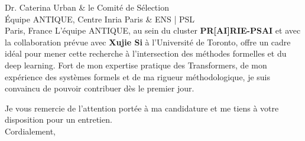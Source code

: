 \documentclass[11pt,a4paper]{letter}
\begin{document}
\begin{letter}{Dr. Caterina Urban \& le Comité de Sélection \\ Équipe ANTIQUE, Centre Inria Paris \& ENS | PSL \\ Paris, France}
L'équipe ANTIQUE, au sein du cluster \textbf{PR[AI]RIE-PSAI} et avec la collaboration prévue avec \textbf{Xujie Si} à l'Université de Toronto, offre un cadre idéal pour mener cette recherche à l'intersection des méthodes formelles et du deep learning. Fort de mon expertise pratique des Transformers, de mon expérience des systèmes formels et de ma rigueur méthodologique, je suis convaincu de pouvoir contribuer dès le premier jour.

\closing{Je vous remercie de l'attention portée à ma candidature et me tiens à votre disposition pour un entretien.\\[1em]
Cordialement,}

\end{letter}
\end{document}
